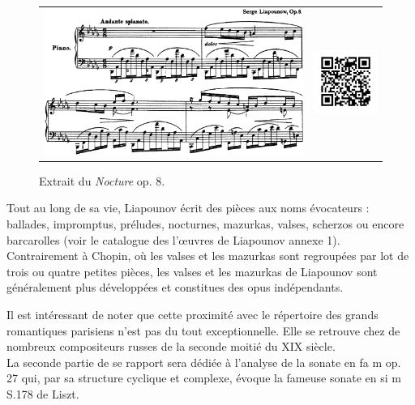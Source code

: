 \begin{figure}[!p]
  \begin{bigcenter}
    \begin{tabular}{lr}
      \includegraphics[width=12.5cm, keepaspectratio]{op8.png}
      &
      \includegraphics[width=3cm, keepaspectratio]{op8-qr.png}
    \end{tabular}
  \end{bigcenter}
  \caption{\label{op3}Extrait du \emph{Nocture} op. 8.}
\end{figure}


Tout au long de sa vie, Liapounov écrit des pièces aux noms évocateurs : ballades, impromptus, préludes, nocturnes, mazurkas, valses, scherzos ou encore barcarolles (voir le catalogue des l'œuvres de Liapounov annexe 1). Contrairement à Chopin, où les valses et les mazurkas sont regroupées par lot de trois ou quatre petites pièces, les valses et les mazurkas de Liapounov sont généralement plus développées et constitues des opus indépendants.

\newpage

Il est intéressant de noter que cette proximité avec le répertoire des grands romantiques parisiens n'est pas du tout exceptionnelle. Elle se retrouve chez de nombreux compositeurs russes de la seconde moitié du XIX\ieme{} siècle.\\

La seconde partie de se rapport sera dédiée à l'analyse de la sonate en fa m op. 27 qui, par sa structure cyclique et complexe, évoque la fameuse sonate en si m S.178 de Liszt.


